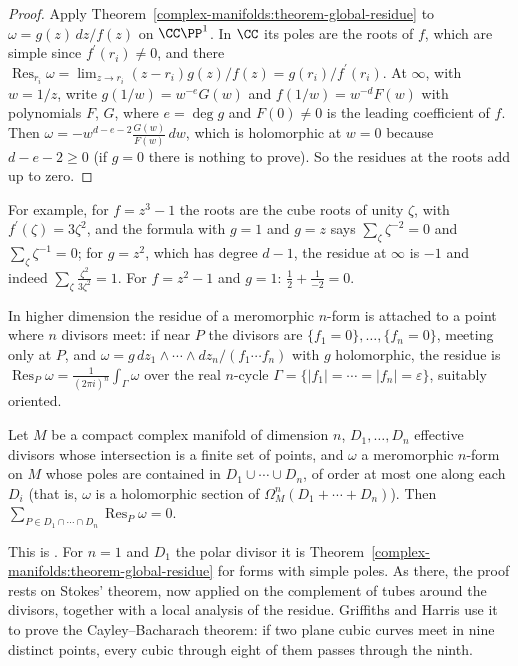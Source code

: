 \begin{proof}
Apply Theorem~\ref{complex-manifolds:theorem-global-residue} to $\omega = g(z)\,dz/f(z)$ on $\CC\PP^1$. In $\CC$ its poles are the roots of $f$, which are simple since $f^{\prime}(r_i) \neq 0$, and there
$\operatorname{Res}_{r_i}\omega = \lim_{z \to r_i}(z - r_i)g(z)/f(z) = g(r_i)/f^{\prime}(r_i)$. At $\infty$, with $w = 1/z$, write $g(1/w) = w^{-e}G(w)$ and $f(1/w) = w^{-d}F(w)$ with polynomials $F$, $G$,
where $e = \deg g$ and $F(0) \neq 0$ is the leading coefficient of $f$. Then $\omega = -w^{d-e-2}\frac{G(w)}{F(w)}\,dw$, which is holomorphic at $w = 0$ because $d - e - 2 \geq 0$ (if $g = 0$ there is nothing to prove).
So the residues at the roots add up to zero.
\end{proof}

For example, for $f = z^3 - 1$ the roots are the cube roots of unity $\zeta$, with $f^{\prime}(\zeta) = 3\zeta^2$, and the formula with $g = 1$ and $g = z$ says $\sum_\zeta\zeta^{-2} = 0$ and $\sum_\zeta\zeta^{-1} = 0$;
for $g = z^2$, which has degree $d - 1$, the residue at $\infty$ is $-1$ and indeed $\sum_\zeta\frac{\zeta^2}{3\zeta^2} = 1$. For $f = z^2 - 1$ and $g = 1$: $\frac{1}{2} + \frac{1}{-2} = 0$.

In higher dimension the residue of a meromorphic $n$-form is attached to a point where $n$ divisors meet: if near $P$ the divisors are $\{f_1 = 0\}, \ldots, \{f_n = 0\}$, meeting only at $P$, and
$\omega = g\,dz_1 \wedge \cdots \wedge dz_n/(f_1 \cdots f_n)$ with $g$ holomorphic, the residue is
$\operatorname{Res}_P\omega = \frac{1}{(2\pi i)^n}\int_\Gamma\omega$ over the real $n$-cycle $\Gamma = \{|f_1| = \cdots = |f_n| = \varepsilon\}$, suitably oriented.

\begin{theorem}\label{complex-manifolds:theorem-global-residue-higher}
Let $M$ be a compact complex manifold of dimension $n$, $D_1, \ldots, D_n$ effective divisors whose intersection is a finite set of points, and $\omega$ a meromorphic $n$-form on $M$ whose poles are
contained in $D_1 \cup \cdots \cup D_n$, of order at most one along each $D_i$ (that is, $\omega$ is a holomorphic section of $\Omega^n_M(D_1 + \cdots + D_n)$). Then
$\sum_{P \in D_1 \cap \cdots \cap D_n}\operatorname{Res}_P\omega = 0$.
\end{theorem}

This is \cite[Chapter 5]{griffiths-harris}. For $n = 1$ and $D_1$ the polar divisor it is Theorem~\ref{complex-manifolds:theorem-global-residue} for forms with simple poles. As there, the proof rests on
Stokes' theorem, now applied on the complement of tubes around the divisors, together with a local analysis of the residue. Griffiths and Harris use it to prove the Cayley--Bacharach theorem: if two plane
cubic curves meet in nine distinct points, every cubic through eight of them passes through the ninth.

